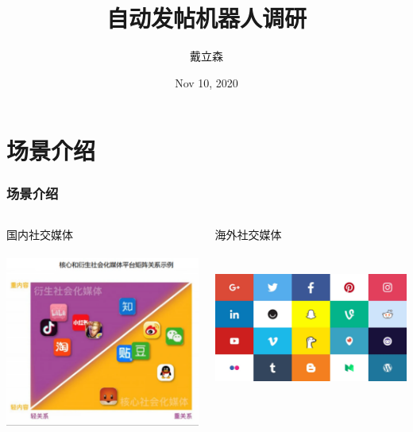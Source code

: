 \documentclass[10pt]{beamer}
\title{
    {自动发帖机器人调研}
}
\author{戴立森}
\date{Nov 10, 2020}
\begin{document}
    \maketitle
    \section*{场景介绍}
        \begin{frame}
            \frametitle{场景介绍}
            \begin{columns}
                \begin{column}{.4\linewidth}
                    国内社交媒体 \\
                    \hspace*{\fill} \\
                    \includegraphics[scale=0.2]{src/img/Social_media_mainland.png}

                \end{column}
                \begin{column}{.4\linewidth}
                    海外社交媒体 \\
                    \hspace*{\fill} \\
                    \hspace*{\fill} \\
                    \includegraphics[scale=0.07]{src/img/Social_media_oversea.jpg}


\end{column}
\end{columns}
\end{frame}
\end{document}
